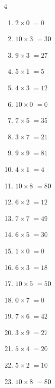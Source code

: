 \begin{multicols}{4}
\begin{enumerate}
  \item $2\times 0$
        $=0$

  \item $10\times 3$
        $=30$

  \item $9\times 3$
        $=27$

  \item $5\times 1$
        $=5$

  \item $4\times 3$
        $=12$

  \item $10\times 0$
        $=0$

  \item $7\times 5$
        $=35$

  \item $3\times 7$
        $=21$

  \item $9\times 9$
        $=81$

  \item $4\times 1$
        $=4$

  \item $10\times 8$
        $=80$

  \item $6\times 2$
        $=12$

  \item $7\times 7$
        $=49$

  \item $6\times 5$
        $=30$

  \item $1\times 0$
        $=0$

  \item $6\times 3$
        $=18$

  \item $10\times 5$
        $=50$

\columnbreak %

  \item $0\times 7$
        $=0$

  \item $7\times 6$
        $=42$

  \item $3\times 9$
        $=27$

  \item $5\times 4$
        $=20$

  \item $5\times 2$
        $=10$

  \item $10\times 8$
        $=80$


\end{enumerate}
\end{multicols}
